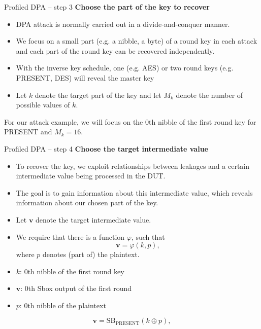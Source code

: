 \begin{frame}{Profiled DPA -- step 3}
    \textbf{Choose the part of the key to recover}
    \begin{itemize}
        \item DPA attack is normally carried out in a divide-and-conquer manner.
       \item We focus on a small part (e.g. a nibble, a byte) of a round key in each attack and each part of the round key can be recovered independently.
       \item With the inverse key schedule, one (e.g. AES) or two round keys (e.g. PRESENT, DES) will reveal the master key
      \item Let $k$ denote the target part of the key and let $M_k$ denote the number of possible values of $k$.
    \end{itemize}
    \begin{example}
        For our attack example, we will focus on the $0$th nibble of the first round key for PRESENT and $M_k=16$.
    \end{example}
\end{frame}

\begin{frame}{Profiled DPA -- step 4}
    \textbf{Choose the target intermediate value}
    \begin{itemize}
        \item To recover the key, we exploit relationships between leakages and a certain intermediate value being processed in the DUT.
       \item The goal is to gain information about this intermediate value, which reveals information about our chosen part of the key.
      \item  Let $\boldsymbol{v}$ denote the target intermediate value.
   \item We require that there is a function $\varphi$, such that
    \[
    \boldsymbol{v}=\varphi(k,p),
    \]
    where $p$ denotes (part of) the plaintext.
    \end{itemize}
    \begin{example}
    \begin{itemize}
        \item $k$: $0$th nibble of the first round key
        \item $\boldsymbol{v}$: $0$th Sbox output of the first round
        \item $p$: $0$th nibble of the plaintext
    \end{itemize}
    \[
    \boldsymbol{v}=\text{SB}_{\text{PRESENT}}(k\oplus p),
    \]
    \end{example}
\end{frame}

